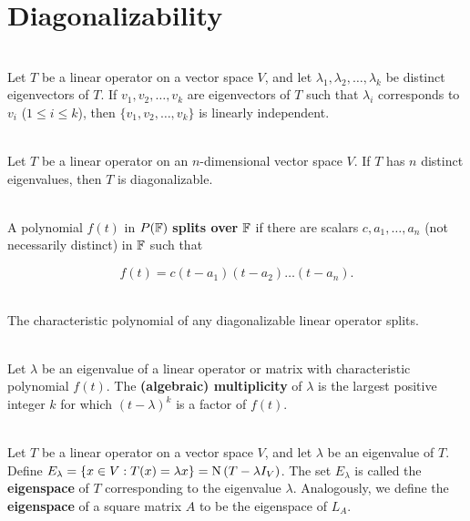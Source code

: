\section{Diagonalizability}

\begin{theorem}
	\hfill\\
	Let $T$ be a linear operator on a vector space $V$, and let $\lambda_1, \lambda_2, \dots, \lambda_k$ be distinct eigenvectors of $T$. If $v_1, v_2, \dots, v_k$ are eigenvectors of $T$ such that $\lambda_i$ corresponds to $v_i$ ($1 \leq i \leq k$), then $\{v_1, v_2, \dots, v_k\}$ is linearly independent.
\end{theorem}

\begin{corollary}
	\hfill\\
	Let $T$ be a linear operator on an $n$-dimensional vector space $V$. If $T$ has $n$ distinct eigenvalues, then $T$ is diagonalizable.
\end{corollary}

\begin{definition}
	\hfill\\
	A polynomial $f(t)$ in $P(\mathbb{F})$ \textbf{splits over} $\mathbb{F}$ if there are scalars $c, a_1, \dots, a_n$ (not necessarily distinct) in $\mathbb{F}$ such that

	\[f(t) = c(t-a_1)(t-a_2)\dots(t-a_n).\]
\end{definition}

\begin{theorem}
	\hfill\\
	The characteristic polynomial of any diagonalizable linear operator splits.
\end{theorem}

\begin{definition}
	\hfill\\
	Let $\lambda$ be an eigenvalue of a linear operator or matrix with characteristic polynomial $f(t)$. The \textbf{(algebraic) multiplicity} of $\lambda$ is the largest positive integer $k$ for which $(t - \lambda)^k$ is a factor of $f(t)$.
\end{definition}

\begin{definition}
	\hfill\\
	Let $T$ be a linear operator on a vector space $V$, and let $\lambda$ be an eigenvalue of $T$. Define $E_\lambda = \{x \in V : T(x) = \lambda x \}=\text{N}\left(T - \lambda I_V\right)$. The set $E_\lambda$ is called the \textbf{eigenspace} of $T$ corresponding to the eigenvalue $\lambda$. Analogously, we define the \textbf{eigenspace} of a square matrix $A$ to be the eigenspace of $L_A$.
\end{definition}

